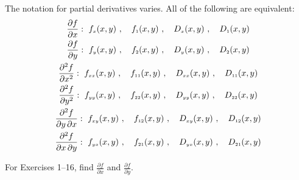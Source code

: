 The notation for partial derivatives varies. All of the following are equivalent:
\begin{gather*}
 \dfrac{\partial f}{\partial x}:~ f_{\scriptscriptstyle x}(x,y) ~, \quad f_{\scriptscriptstyle 1}(x,y) ~, \quad D_{\scriptscriptstyle x}(x,y) ~, \quad
  D_{\scriptscriptstyle 1}(x,y)\\
 \dfrac{\partial f}{\partial y}:~ f_{\scriptscriptstyle y}(x,y) ~, \quad f_{\scriptscriptstyle 2}(x,y) ~, \quad D_{\scriptscriptstyle y}(x,y) ~, \quad
  D_{\scriptscriptstyle 2}(x,y)\\
 \dfrac{\partial^2 f}{\partial x^2}:~ f_{\scriptscriptstyle xx}(x,y) ~, \quad f_{\scriptscriptstyle 11}(x,y) ~, \quad D_{\scriptscriptstyle xx}(x,y) ~, \quad
  D_{\scriptscriptstyle 11}(x,y)\\
 \dfrac{\partial^2 f}{\partial y^2}:~ f_{\scriptscriptstyle yy}(x,y) ~, \quad f_{\scriptscriptstyle 22}(x,y) ~, \quad D_{\scriptscriptstyle yy}(x,y) ~, \quad
  D_{\scriptscriptstyle 22}(x,y)\\
 \dfrac{\partial^2 f}{\partial y \, \partial x}: ~ f_{\scriptscriptstyle xy}(x,y) ~, \quad f_{\scriptscriptstyle 12}(x,y) ~, \quad
  D_{\scriptscriptstyle xy}(x,y) ~, \quad
  D_{\scriptscriptstyle 12}(x,y)\\
 \dfrac{\partial^2 f}{\partial x \, \partial y}: ~ f_{\scriptscriptstyle yx}(x,y) ~, \quad f_{\scriptscriptstyle 21}(x,y) ~, \quad
  D_{\scriptscriptstyle yx}(x,y) ~, \quad
  D_{\scriptscriptstyle 21}(x,y)
\end{gather*}
\centerline{}\label{sec2dot2}
\par\noindent For Exercises 1--16, find $\frac{\partial f}{\partial x}$ and $\frac{\partial f}{\partial y}$.
